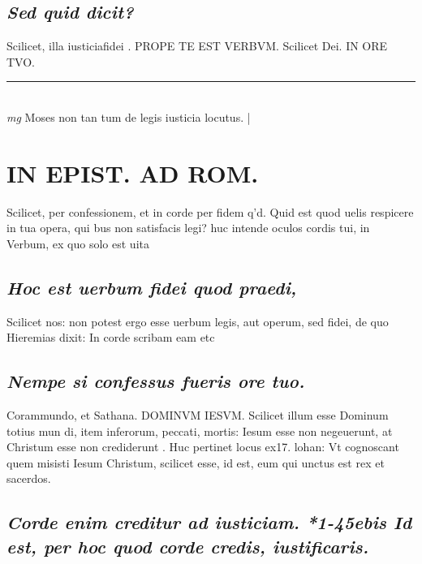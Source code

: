 \documentclass{article}
\begin{document}
\begin{pages}
\subsection*{\textit{Sed quid dicit? }}\pstart Scilicet, illa iusticiafidei . PROPE TE EST VERBVM. Scilicet Dei. IN ORE TVO.   \pend
\vspace{0.5cm}\noindent
\vspace{0.2cm}\rule{1cm}{0.2pt}\\ 
\hspace{0.2cm}\textit{mg}
\footnotesize Moses non tan tum de legis iusticia locutus.  
\normalsize| 
\section*{IN EPIST. AD ROM.  }
\marginpar{[ p.120 ]}\pstart Scilicet, per confessionem, et in corde per fidem q'd. Quid est quod uelis respicere in tua opera, qui bus non satisfacis legi? huc intende oculos cordis tui, in Verbum, ex quo solo est uita\pend
{}
{}
\subsection*{\textit{Hoc est uerbum fidei quod praedi, }}\pstart Scilicet nos: non potest ergo esse uerbum legis, aut operum, sed fidei, de quo Hieremias dixit: In corde scribam eam etc\pend
{}
{}
\subsection*{\textit{Nempe si confessus fueris ore tuo.  }}\pstart Corammundo, et Sathana. DOMINVM IESVM. Scilicet illum esse Dominum totius mun di, item inferorum, peccati, mortis: Iesum esse non negeuerunt, at Christum esse non crediderunt . Huc pertinet locus ex17. lohan: Vt cognoscant quem misisti Iesum Christum, scilicet esse, id est, eum qui unctus est rex et sacerdos.   \pend
{}
{}
\subsection*{\textit{Corde enim creditur ad iusticiam. *1-45ebis Id est, per hoc quod corde credis, iustificaris.  }}
{}

\end{pages}
\end{document}

